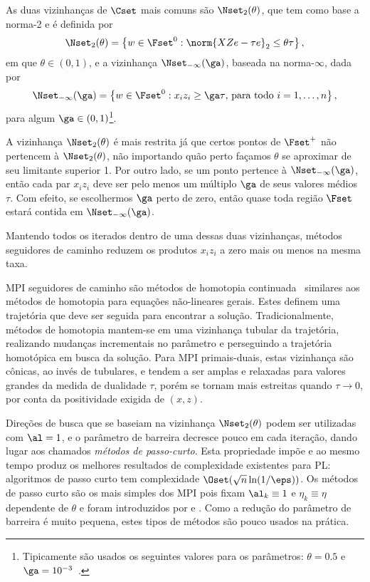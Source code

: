As duas vizinhanças de $\Cset$ mais comuns são  $\Nset_2(\theta)$, que tem como base a norma-2 e é definida por
\[
\Nset_2(\theta) = \left\{w\in\Fset^0 : \norm{XZe - \tau e}_2 \leq \theta\tau  
\right\},
\]
em que $\theta \in (0,1)$, e a vizinhança 
$\Nset_{-\infty}(\ga)$, baseada na norma-$\infty$, dada por 
\begin{equation}
\label{eq:infty-neig}
\Nset_{-\infty}(\ga) = \left\{w\in\Fset^0 : x_iz_i\geq \ga\tau\text{, para
todo }i =1,\dotsc,n \right\},
\end{equation}
para algum $\ga\in(0,1)$\footnote{Tipicamente são usados os seguintes valores 
para os parâmetros: $\theta = 0.5$ e $\ga = 10^{-3}$~\cite[pg.
9]{Wright:Primal-dual-interior-point:1997h}.}.

A vizinhança $\Nset_2(\theta)$ é mais restrita já que certos pontos de $\Fset^+$
não pertencem à $\Nset_2(\theta)$, não importando quão perto façamos $\theta$ se
aproximar de seu limitante superior 1. Por outro lado, se um ponto pertence à
$\Nset_{-\infty}(\ga)$, então cada par $x_iz_i$ deve ser pelo menos um múltiplo
$\ga$ de seus valores médios $\tau$. Com efeito, se escolhermos $\ga$ perto de
zero, então quase toda região $\Fset$ estará contida em $\Nset_{-\infty}(\ga)$. 

Mantendo todos os iterados dentro de uma dessas duas vizinhanças, métodos
seguidores de caminho reduzem  os produtos $x_iz_i$ a zero mais ou menos na
mesma taxa.


\ac{MPI} seguidores de caminho são  métodos de homotopia
continuada~\cite{Nazareth:1986jg}
similares aos métodos de homotopia para equações não-lineares gerais. Estes
definem uma trajetória que
deve ser seguida para encontrar a solução. Tradicionalmente, métodos de
homotopia mantem-se em uma vizinhança tubular da trajetória, realizando mudanças
incrementais no parâmetro e perseguindo a trajetória homotópica em busca da
solução. Para \ac{MPI} primais-duais, estas vizinhança são cônicas, ao invés de
tubulares, e tendem a ser amplas e relaxadas  para valores grandes da medida de
dualidade $\tau$, porém se tornam mais estreitas quando $\tau\to0$, por conta da
positividade exigida de $(x,z)$.


 Direções de busca que se baseiam na vizinhança $\Nset_2(\theta)$ podem ser
 utilizadas com $\al=1$, e o parâmetro de barreira decresce pouco em cada
 iteração, dando lugar aos chamados \emph{métodos de passo-curto}. Esta
 propriedade impõe e ao mesmo tempo produz os melhores resultados de
 complexidade existentes para \ac{PL}: algoritmos de passo curto tem
 complexidade $\Oset(\sqrt{n}\ln (1/\eps))$. Os métodos de passo curto
 são os mais simples dos \ac{MPI} pois fixam $\al_k\equiv  1$ e $\eta_k \equiv \eta$
 dependente de $\theta$ e foram introduzidos por
 \citet{Kojima:1989fw} e \citet{Monteiro:1989go}. Como a redução do
 parâmetro de barreira é muito pequena, estes tipos de métodos são pouco usados
 na prática.
   
